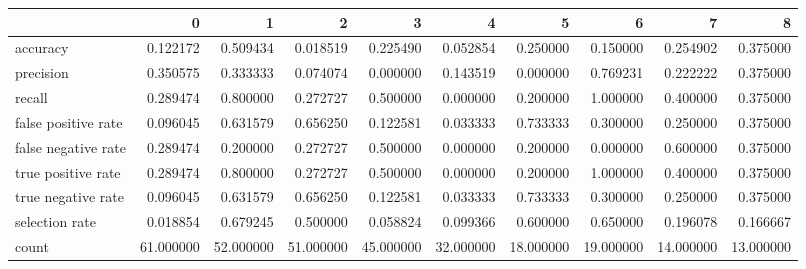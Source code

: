 \begin{tabular}{lrrrrrrrrr}
\toprule
{} &          0 &          1 &          2 &          3 &          4 &          5 &          6 &          7 &          8 \\
\midrule
accuracy            &   0.122172 &   0.509434 &   0.018519 &   0.225490 &   0.052854 &   0.250000 &   0.150000 &   0.254902 &   0.375000 \\
precision           &   0.350575 &   0.333333 &   0.074074 &   0.000000 &   0.143519 &   0.000000 &   0.769231 &   0.222222 &   0.375000 \\
recall              &   0.289474 &   0.800000 &   0.272727 &   0.500000 &   0.000000 &   0.200000 &   1.000000 &   0.400000 &   0.375000 \\
false positive rate &   0.096045 &   0.631579 &   0.656250 &   0.122581 &   0.033333 &   0.733333 &   0.300000 &   0.250000 &   0.375000 \\
false negative rate &   0.289474 &   0.200000 &   0.272727 &   0.500000 &   0.000000 &   0.200000 &   0.000000 &   0.600000 &   0.375000 \\
true positive rate  &   0.289474 &   0.800000 &   0.272727 &   0.500000 &   0.000000 &   0.200000 &   1.000000 &   0.400000 &   0.375000 \\
true negative rate  &   0.096045 &   0.631579 &   0.656250 &   0.122581 &   0.033333 &   0.733333 &   0.300000 &   0.250000 &   0.375000 \\
selection rate      &   0.018854 &   0.679245 &   0.500000 &   0.058824 &   0.099366 &   0.600000 &   0.650000 &   0.196078 &   0.166667 \\
count               &  61.000000 &  52.000000 &  51.000000 &  45.000000 &  32.000000 &  18.000000 &  19.000000 &  14.000000 &  13.000000 \\
\bottomrule
\end{tabular}
